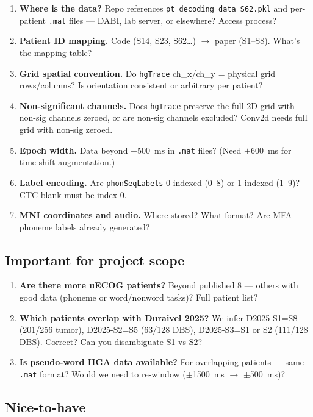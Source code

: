 \documentclass[11pt, letterpaper]{article}
\begin{document}
\begin{enumerate}[nosep]
  \item \textbf{Where is the data?} Repo references \texttt{pt\_decoding\_data\_S62.pkl} and per-patient \texttt{.mat} files --- DABI, lab server, or elsewhere? Access process?
  \item \textbf{Patient ID mapping.} Code (S14, S23, S62\ldots) $\to$ paper (S1--S8). What's the mapping table?
  \item \textbf{Grid spatial convention.} Do \texttt{hgTrace} ch\_x/ch\_y = physical grid rows/columns? Is orientation consistent or arbitrary per patient?
  \item \textbf{Non-significant channels.} Does \texttt{hgTrace} preserve the full 2D grid with non-sig channels zeroed, or are non-sig channels excluded? Conv2d needs full grid with non-sig zeroed.
  \item \textbf{Epoch width.} Data beyond $\pm$500~ms in \texttt{.mat} files? (Need $\pm$600~ms for time-shift augmentation.)
  \item \textbf{Label encoding.} Are \texttt{phonSeqLabels} 0-indexed (0--8) or 1-indexed (1--9)? CTC blank must be index 0.
  \item \textbf{MNI coordinates and audio.} Where stored? What format? Are MFA phoneme labels already generated?
\end{enumerate}

\subsection{Important for project scope}

\begin{enumerate}[nosep, start=8]
  \item \textbf{Are there more uECOG patients?} Beyond published 8 --- others with good data (phoneme or word/nonword tasks)? Full patient list?
  \item \textbf{Which patients overlap with Duraivel 2025?} We infer D2025-S1=S8 (201/256 tumor), D2025-S2=S5 (63/128 DBS), D2025-S3=S1 or S2 (111/128 DBS). Correct? Can you disambiguate S1 vs S2?
  \item \textbf{Is pseudo-word HGA data available?} For overlapping patients --- same \texttt{.mat} format? Would we need to re-window ($\pm$1500~ms $\to$ $\pm$500~ms)?
\end{enumerate}

\subsection{Nice-to-have}
\end{document}
